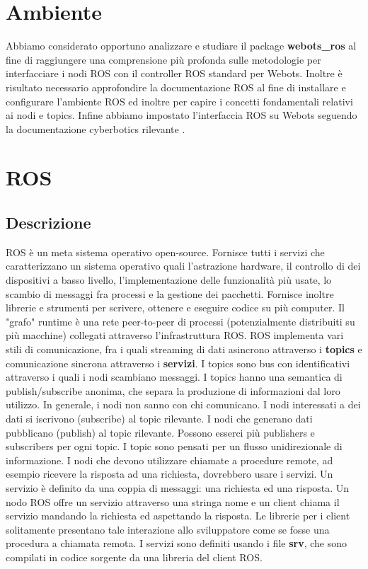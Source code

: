 \documentclass[a4paper]{article}
\begin{document}
	\section{Ambiente}\label{sec:Ambiente}
	Abbiamo considerato opportuno analizzare e studiare il package \textbf{webots\_ros} \cite{cyberbotics} al fine di raggiungere una comprensione più profonda sulle metodologie per interfacciare i nodi ROS con il controller ROS standard per Webots. Inoltre è risultato necessario approfondire la documentazione ROS \cite{ros.org} al fine di installare e configurare l'ambiente ROS ed inoltre per capire i concetti fondamentali relativi ai nodi e topics. Infine abbiamo impostato l'interfaccia ROS su Webots seguendo la documentazione cyberbotics rilevante \cite{webotsRosSetup}.
	
	\section{ROS}\label{sec:Ros}
	
	\subsection{Descrizione}\label{subsec:Descrizione}
	ROS \cite{ros.org} è un meta sistema operativo open-source. Fornisce tutti i servizi che caratterizzano un sistema operativo quali l'astrazione hardware, il controllo di dei dispositivi a basso livello, l'implementazione delle funzionalità più usate, lo scambio di messaggi fra processi e la gestione dei pacchetti. Fornisce inoltre librerie e strumenti per scrivere, ottenere e eseguire codice su più computer. Il "grafo" runtime è una rete peer-to-peer di processi (potenzialmente distribuiti su più macchine) collegati attraverso l'infrastruttura ROS. ROS implementa vari stili di comunicazione, fra i quali streaming di dati asincrono attraverso i \textbf{topics} e comunicazione sincrona attraverso i \textbf{servizi}. 
	I topics sono bus con identificativi attraverso i quali i nodi scambiano messaggi. I topics hanno una semantica di publish/subscribe anonima, che separa la produzione di informazioni dal loro utilizzo. In generale, i nodi non sanno con chi comunicano. I nodi interessati a dei dati si iscrivono (subscribe) al topic rilevante. I nodi che generano dati pubblicano (publish) al topic rilevante. Possono esserci più publishers e subscribers per ogni topic. I topic sono pensati per un flusso unidirezionale di informazione. I nodi che devono utilizzare chiamate a procedure remote, ad esempio ricevere la risposta ad una richiesta, dovrebbero usare i servizi. Un servizio è definito da una coppia di messaggi: una richiesta ed una risposta. Un nodo ROS offre un servizio attraverso una stringa nome e un client chiama il servizio mandando la richiesta ed aspettando la risposta. Le librerie per i client solitamente presentano tale interazione allo sviluppatore come se fosse una procedura a chiamata remota. I servizi sono definiti usando i file \textbf{srv}, che sono compilati in codice sorgente da una libreria del client ROS.
	
\end{document}
